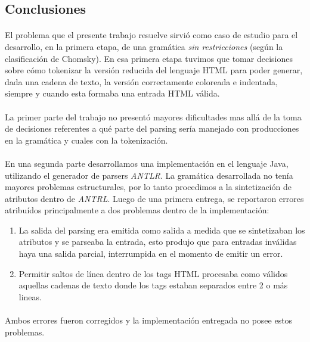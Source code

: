\subsection{Conclusiones}
\paragraph{}El problema que el presente trabajo resuelve sirvi\'o como caso de estudio para el desarrollo, en la primera etapa, de una gram\'atica \emph{sin restricciones} (seg\'un la clasificaci\'on de Chomsky). En esa primera etapa tuvimos que tomar decisiones sobre c\'omo tokenizar la versi\'on reducida del lenguaje HTML para poder generar, dada una cadena de texto, la versi\'on correctamente coloreada e indentada, siempre y cuando esta formaba una entrada HTML v\'alida.

\paragraph{}La primer parte del trabajo no present\'o mayores dificultades mas all\'a de la toma de decisiones referentes a qu\'e parte del parsing ser\'ia manejado con producciones en la gram\'atica y cuales con la tokenizaci\'on. 

\paragraph{}En una segunda parte desarrollamos una implementaci\'on en el lenguaje Java, utilizando el generador de parsers \emph{ANTLR}. La gram\'atica desarrollada no ten\'ia mayores problemas estructurales, por lo tanto procedimos a la sintetizaci\'on de atributos dentro de \emph{ANTRL}. Luego de una primera entrega, se reportaron errores atribu\'idos principalmente a dos problemas dentro de la implementaci\'on:

\begin{enumerate}
    \item La salida del parsing era emitida como salida a medida que se sintetizaban los atributos y se parseaba la entrada, esto produjo que para entradas inv\'alidas haya una salida parcial, interrumpida en el momento de emitir un error. 
    \item Permitir saltos de l\'inea dentro de los tags HTML procesaba como v\'alidos aquellas cadenas de texto donde los tags estaban separados entre 2 o m\'as lineas. 
\end{enumerate}

\paragraph{}Ambos errores fueron corregidos y la implementaci\'on entregada no posee estos problemas.

